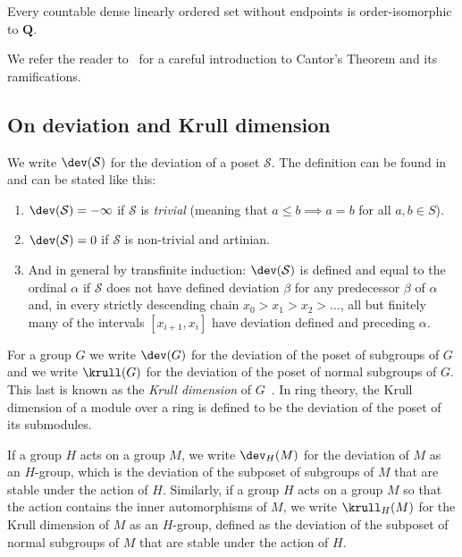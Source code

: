 \begin{cantorstheorem}
Every countable dense linearly ordered set without endpoints is order-isomorphic to $\mathbf Q$.
\end{cantorstheorem}

We refer the reader to~\cite[Chapter~9]{perms} for a careful introduction to Cantor's Theorem and its ramifications.


\subsection{On deviation and Krull dimension}

We write $\dev(\mathcal S)$ for the deviation of a poset $\mathcal S$. The definition can be found in~\cite{MR} and can be stated like this:
\begin{enumerate}\romanenumi
\item \label{list2.3.1}$\dev(\mathcal S)=-\infty$ if $\mathcal S$ is \emph{trivial} (meaning that $a\le b\implies a=b$ for all $a,b\in S$).
\item \label{list2.3.2}$\dev(\mathcal S)=0$ if $\mathcal S$ is non-trivial and artinian.
\item \label{list2.3.3}And in general by transfinite induction: $\dev(\mathcal S)$ is defined and equal to the ordinal $\alpha$ if $\mathcal S$ does not have defined deviation $\beta$ for any predecessor $\beta$ of $\alpha$ and, in every strictly descending chain $x_0>x_1>x_2>\dots$, all but finitely many of the intervals $[x_{i+1},x_i] $ have deviation defined and preceding $\alpha$.
\end{enumerate}


For a group $G$ we write $\dev(G)$ for the deviation of the poset of subgroups of $G$ and we write $\krull(G)$ for the deviation of the poset of normal subgroups of $G$. This last is known as the \emph{Krull dimension} of $G$~\cite{Tus}. In ring theory, the Krull dimension of a module over a ring is defined to be the deviation of the poset of its submodules.

If a group $H$ acts on a group $M$, we write $\dev_H(M)$ for the deviation of $M$ as an $H$-group, which is the deviation of the subposet of subgroups of $M$ that are stable under the action of $H$. Similarly, if a group $H$ acts on a group $M$ so that the action contains the inner automorphisms of $M$, we write $\krull_H(M)$ for the Krull dimension of $M$ as an $H$-group, defined as the deviation of the subposet of normal subgroups of $M$ that are stable under the action of $H$.


